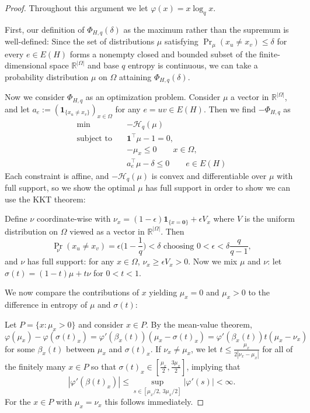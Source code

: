\documentclass[12pt]{article}
\begin{document}
\begin{proof}
Throughout this argument we let $\varphi(x)=x\log_qx$.

First, our definition of $\Phi_{H,q}(\delta)$ as the maximum rather than the supremum is well-defined: Since the set of distributions $\mu$ satisfying $\Pr_\mu(x_u\not=x_v)\leq\delta$ for every $e\in E(H)$ forms a nonempty closed and bounded subset of the finite-dimensional space $\mathbb R^{|\Omega|}$ and base $q$ entropy is continuous, we can take a probability distribution $\mu$ on $\Omega$ attaining $\Phi_{H,q}(\delta)$.

Now we consider $\Phi_{H,q}$ as an optimization problem. Consider $\mu$ a vector in $\mathbb R^{|\Omega|}$, and let $a_{e}:=(\mathbf1_{\{x_u\not=x_v\}})_{x\in\Omega}$ for any $e=uv\in E(H)$. Then we find $-\Phi_{H,q}$ as
\[
\begin{aligned}
\min\quad & -\mathcal{H}_q(\mu)\\
\text{subject to}\quad
&\mathbf1^\top\mu-1=0,\\
&-\mu_x\leq0\qquad x\in\Omega,\\
&a_{e}^\top\mu-\delta\leq0\qquad e\in E(H)
\end{aligned}
\]
Each constraint is affine, and $-\mathcal{H}_q(\mu)$ is convex and differentiable over $\mu$ with full support, so we  show the optimal $\mu$ has full support in order to show we can use the KKT theorem:

Define $\nu$ coordinate-wise with $\nu_x=(1-\epsilon)\mathbf1_{\{x=\mathbf0\}}+\epsilon V_x$ where $V$ is the uniform distribution on $\Omega$ viewed as a vector in $\mathbb R^{|\Omega|}$. Then
\[
\Pr_{\nu}(x_u\not=x_v)=\epsilon\bigl(1-\frac 1q\bigr)<\delta\text{ choosing }0<\epsilon<\delta\frac{q}{q-1},
\]
and $\nu$ has full support: for any $x\in\Omega$, $\nu_x\geq\epsilon V_x>0$. Now we mix $\mu$ and $\nu$: let $\sigma(t)=(1-t)\mu+t\nu$ for $0<t<1$.

We now compare the contributions of $x$ yielding $\mu_x=0$ and $\mu_x>0$ to the difference in entropy of $\mu$ and $\sigma(t)$:

Let $P=\{x:\mu_x>0\}$ and consider $x\in P$. By the mean-value theorem,
\[
\varphi(\mu_x)-\varphi(\sigma(t)_x)=\varphi'(\beta_x(t))(\mu_x-\sigma(t)_x)=\varphi'(\beta_x(t))t(\mu_x-\nu_x)
\] 
for some $\beta_x(t)$ between $\mu_x$ and $\sigma(t)_x$. If $\nu_x\not=\mu_x$, we  let $t\leq\frac{\mu_x}{2|\nu_x-\mu_x|}$ for all of the finitely many $x\in P$ so that $\sigma(t)_x\in[\frac{\mu_x}2,\frac{3\mu_x}2]$, implying that
\[
|\varphi'(\beta(t)_x)|\leq\sup_{s\in[{\mu_x/}2,\ 3\mu_x/2]}\left|\varphi'(s)\right|<\infty.
\]
For the $x\in P$ with $\mu_x=\nu_x$ this follows immediately.


\end{proof}
\end{document}
